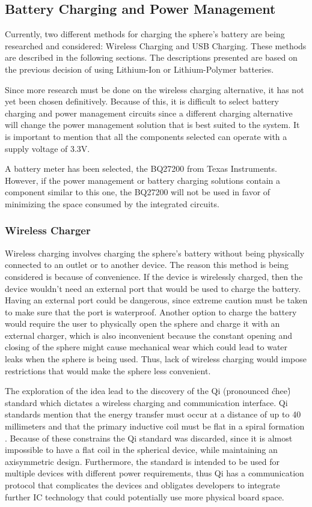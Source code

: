 \subsection{Battery Charging and Power Management}
\label{sec:chargingMethods}
Currently, two different methods for charging the sphere's battery are being researched and considered: Wireless Charging and USB Charging.  These methods are described in the following sections.  The descriptions presented are based on the previous decision of using Lithium-Ion or Lithium-Polymer batteries.

Since more research must be done on the wireless charging alternative, it has not yet been chosen definitively.  Because of this, it is difficult to select battery charging and power management circuits since a different charging alternative will change the power management solution that is best suited to the system.  It is important to mention that all the components selected can operate with a supply voltage of 3.3V.

A battery meter has been selected, the BQ27200 from Texas Instruments.  However, if the power management or battery charging solutions contain a component similar to this one, the BQ27200 will not be used in favor of minimizing the space consumed by the integrated circuits.

\subsubsection{Wireless Charger}
Wireless charging involves charging the sphere's battery without being physically connected to an outlet or to another device. The reason this method is being considered is because of convenience. If the device is wirelessly charged, then the device wouldn't need an external port that would be used to charge the battery. Having an external port could be dangerous, since extreme caution must be taken to make sure that the port is waterproof. Another option to charge the battery would require the user to physically open the sphere and charge it with an external charger, which is also inconvenient because the constant opening and closing of the sphere might cause mechanical wear which could lead to water leaks when the sphere is being used. Thus, lack of wireless charging would impose restrictions that would make the sphere less convenient.

The exploration of the idea lead to the discovery of the Qi (pronounced \'chee\') standard which dictates a wireless charging and communication interface. Qi standards mention that the energy transfer must occur at a distance of up to 40 millimeters and that the primary inductive coil must be flat in a spiral formation \cite{QiStandard}. Because of these constrains the Qi standard was discarded, since it is almost impossible to have a flat coil in the spherical device, while maintaining an axisymmetric design. Furthermore, the standard is intended to be used for multiple devices with different power requirements, thus Qi has a communication protocol that complicates the devices and obligates developers to integrate further IC technology that could potentially use more physical board space. 

